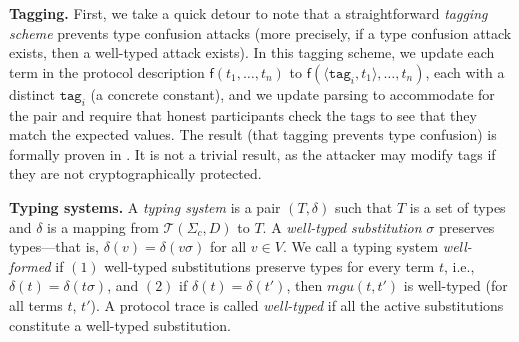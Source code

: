 \documentclass{article}
\theoremstyle{definition}
\begin{document}
\textbf{Tagging.} First, we take a quick detour to note that a straightforward \emph{tagging scheme} 
prevents type confusion attacks (more precisely, if a type confusion attack exists, then a well-typed attack exists). 
In this tagging scheme, we update each term in the protocol description $\mathsf{f}(t_1, \dots, t_n)$ 
to $\mathsf{f}(\langle \texttt{tag}_i, t_1 \rangle, \dots, t_n)$, 
each with a distinct  $\texttt{tag}_i$ (a concrete constant), 
and we update parsing to accommodate for the pair and require that honest participants check the tags 
to see that they match the expected values. 
The result (that tagging prevents type confusion) is formally proven in \cite{tagging}. 
It is not a trivial result, as the attacker may modify tags if they are not cryptographically protected.

\textbf{Typing systems.} A \textit{typing system} is a pair $(T, \delta)$ such that $T$ is a set of types and $\delta$ is a mapping from $\mathcal{T}(\Sigma_c, D)$ to $T$. A \textit{well-typed substitution} $\sigma$ preserves types---that is, $\delta(v) = \delta(v\sigma)$ for all $v \in V$. We call a typing system \emph{well-formed} if $(1)$ well-typed substitutions preserve types for every term $t$, i.e., $\delta(t) = \delta(t\sigma)$, and $(2)$ if $\delta(t) = \delta(t')$, then $mgu(t, t')$ is well-typed (for all terms $t$, $t'$). A protocol trace is called \emph{well-typed} if all the active substitutions constitute a well-typed substitution.
\end{document}
